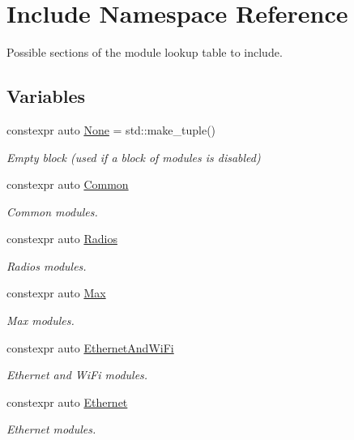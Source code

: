 \hypertarget{namespace_include}{}\section{Include Namespace Reference}
\label{namespace_include}


Possible sections of the module lookup table to include.  


\subsection*{Variables}
\begin{DoxyCompactItemize}
\item 
constexpr auto \hyperlink{namespace_include_a223a3f93bed9db5706b58e6fd15c8810}{None} = std\+::make\+\_\+tuple()
\begin{DoxyCompactList}\small\item\em Empty block (used if a block of modules is disabled) \end{DoxyCompactList}\item 
constexpr auto \hyperlink{namespace_include_afd5c6184c21e5cbb570f6ffb451fadb2}{Common}
\begin{DoxyCompactList}\small\item\em Common modules. \end{DoxyCompactList}\item 
constexpr auto \hyperlink{namespace_include_aaef3f142b15f5413c545a4b50a662fcc}{Radios}
\begin{DoxyCompactList}\small\item\em Radios modules. \end{DoxyCompactList}\item 
constexpr auto \hyperlink{namespace_include_aee5c809c679bf94fd69dc5deff6a90c4}{Max}
\begin{DoxyCompactList}\small\item\em Max modules. \end{DoxyCompactList}\item 
constexpr auto \hyperlink{namespace_include_a5f31f767a008f601b5d4f5c3aff90e89}{Ethernet\+And\+Wi\+Fi}
\begin{DoxyCompactList}\small\item\em Ethernet and Wi\+Fi modules. \end{DoxyCompactList}\item 
constexpr auto \hyperlink{namespace_include_a68386b4fe2e4f182c18b0f4b1e1ca554}{Ethernet}
\begin{DoxyCompactList}\small\item\em Ethernet modules. \end{DoxyCompactList}\item 

\end{DoxyCompactItemize}
